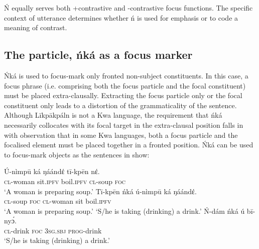 \documentclass[output=paper,colorlinks,citecolor=brown]{langscibook}
\begin{document}
\ea%
    \label{ex:bisilki:12}
    \z
\z

Ń equally serves both +contrastive and -contrastive focus functions. The specific context of utterance determines whether ń is used for emphasis or to code a meaning of contrast.

\subsection{The particle, ńká as a focus marker}\label{sec:bisilki:5.2}

Ńká is used to focus-mark only fronted non-subject constituents. In this case, a focus phrase (i.e. comprising both the focus particle and the focal constituent) must be placed extra-clausally. Extracting the focus particle only or the focal constituent only leads to a distortion of the grammaticality of the sentence. Although Līkpākpáln is not a Kwa language, the requirement that ńká necessarily collocates with its focal target in the extra-clausal position falls in with  observation that in some Kwa languages, both a focus particle and the focalised element must be placed together in a fronted position. Ńká can be used to focus-mark objects as the sentences in  show:

\ea%
    \label{ex:bisilki:13}
    \ea\label{ex:bisilki:13a}
    \gll    Ú-nìmpū	ká		ŋáándέ	tī-kpēn	nέ.\\
            \textsc{cl-}woman	sit\textsc{.ipfv}	boil\textsc{.ipfv}	\textsc{cl-}soup	\textsc{foc}\\
    \glt    ‘A woman is preparing soup.’
    \ex\label{ex:bisilki:13b}
    \gll    Tī-kpēn	ńká	ú-nìmpū	ká	ŋáándέ.\\
            \textsc{cl-}soup	\textsc{foc}	\textsc{cl-}woman	sit	boil\textsc{.ipfv}\\
    \glt    ‘A woman is preparing soup.’
    \jambox*{[canonical]}
    \glt    ‘S/he is taking (drinking) a drink.’
    \ex\label{ex:bisilki:13d}
    \gll    Ń-dám	ńká	ú		bī-nyɔ́.\\
            \textsc{cl-}drink	\textsc{foc}	\textsc{3sg.sbj}	\textsc{prog-}drink\\
    \glt    ‘S/he is taking (drinking) a drink.’
    \z
\z
\end{document}
